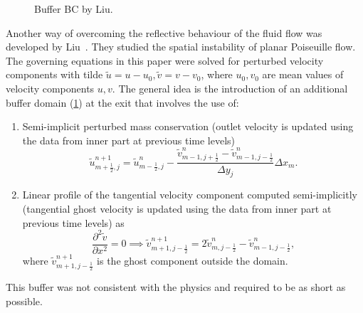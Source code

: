 \documentclass{article}
\numberwithin{equation}{section}
\begin{document}
\begin{figure}[H] %
  \caption{Buffer BC by Liu.}\label{fig:BC-buffer}
\end{figure}
Another way of overcoming the reflective behaviour of the fluid flow was developed by Liu~\cite{Liu:1993}. They studied the spatial instability of planar Poiseuille flow. The governing equations in this paper were solved for perturbed velocity components with tilde $\tilde{u}=u-u_0,\tilde{v}=v-v_0$, where $u_0,v_0$ are mean values of velocity components $u,v$. The general idea is the introduction of an additional buffer domain (\cref{fig:BC-buffer}) at the exit that involves the use of:
\begin{enumerate}
	\item Semi-implicit perturbed mass conservation (outlet velocity is updated using the data from inner part at previous time levels)
	\begin{equation*}
		\tilde{u}_{m+\frac{1}{2},j}^{n+1}=\tilde{u}_{m-\frac{1}{2},j}^n-\frac{\tilde{v}^n_{m-1,j+\frac{1}{2}}-\tilde{v}^n_{m-1,j-\frac{1}{2}}}{\Delta y_{j}}{\Delta x_m}.
	\end{equation*}
	\item Linear profile of the tangential velocity component computed semi-implicitly (tangential ghost velocity is updated using the data from inner part at previous time levels) as
	\begin{equation*}
		\frac{\partial ^2 \tilde{v}}{\partial x^2}=0\implies \tilde{v}^{n+1}_{m+1,j-\frac{1}{2}}=2\tilde{v}^n_{m,j-\frac{1}{2}}-\tilde{v}^n_{m-1,j-\frac{1}{2}},
	\end{equation*}
	where $\tilde{v}^{n+1}_{m+1,j-\frac{1}{2}}$ is the ghost component outside the domain.
\end{enumerate}
This buffer was not consistent with the physics and required to be as short as possible. 
\end{document}

